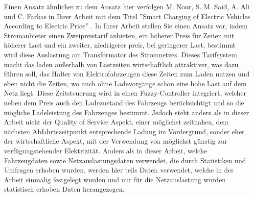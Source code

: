 Einen Ansatz ähnlicher zu dem Ansatz hier verfolgen M. Nour, S. M. Said, A. Ali und C. Farkas in Ihrer Arbeit mit dem Titel ''Smart Charging of Electric Vehicles According to Electric Price'' \cite{RW_2_1}. In Ihrer Arbeit stellen Sie einen Ansatz vor, indem Stromanbieter einen Zweipreistarif anbieten, ein höherer Preis für Zeiten mit höherer Last und ein zweiter, niedrigerer preis, bei geringerer Last, bestimmt wird diese Auslastung am Transformator des Stromnetzes. Dieses Tarifsystem macht das laden außerhalb von Lastzeiten wirtschaftlich attraktiver, was dazu führen soll, das Halter von Elektrofahrzeugen diese Zeiten zum Laden nutzen und eben nicht die Zeiten, wo auch ohne Ladevorgänge schon eine hohe Last auf dem Netz liegt. Diese Zeitsteuerung wird in einen Fuzzy-Controller integriert, welcher neben dem Preis auch den Ladezustand des Fahrzeugs berücksichtigt und so die mögliche Ladeleistung des Fahrzeuges bestimmt. Jedoch steht anders als in dieser Arbeit nicht der Quality of Service Aspekt, einer möglichst zeitnahen,  dem nächsten Abfahrtszeitpunkt entsprechende Ladung im Vordergrund, sonder eher der wirtschaftliche Aspekt, mit der Verwendung von möglichst günstig zur verfügungstehender Elektrizität. Anders als in dieser Arbeit, welche Fahrzeugdaten sowie Netzauslastungsdaten verwendet, die durch Statistiken und Umfragen erhoben wurden, werden hier teils Daten verwendet, welche in der Arbeit einmalig festgelegt wurden und nur für die Netzauslastung wurden statistisch erhoben Daten herangezogen. 

